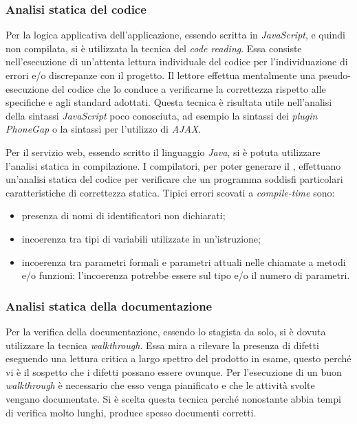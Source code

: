 \subsubsection{Analisi statica del codice}


Per la logica applicativa dell'applicazione, essendo scritta in \textit{JavaScript}, e quindi non compilata, si è utilizzata la tecnica del \textit{code reading}. Essa consiste nell'esecuzione di un'attenta lettura individuale del codice per l'individuazione di errori e/o discrepanze con il progetto. Il lettore effettua mentalmente una pseudo-esecuzione del codice che lo conduce a verificarne la correttezza rispetto alle specifiche e agli standard adottati. Questa tecnica è risultata utile nell'analisi della sintassi \textit{JavaScript} poco conosciuta, ad esempio la sintassi dei \textit{plugin PhoneGap} o la sintassi per l'utilizzo di \textit{AJAX}.


Per il servizio web, essendo scritto il linguaggio \textit{Java}, si è potuta utilizzare l'analisi statica in compilazione. I compilatori, per poter generare il , effettuano un'analisi statica del codice per verificare che un programma soddisfi particolari caratteristiche di correttezza statica. Tipici errori scovati a \textit{compile-time} sono:
\begin{itemize}
	\item presenza di nomi di identificatori non dichiarati;
	\item incoerenza tra tipi di variabili utilizzate in un'istruzione;
	\item incoerenza tra parametri formali e parametri attuali nelle chiamate a metodi e/o funzioni: l'incoerenza potrebbe essere sul tipo e/o il numero di parametri.
\end{itemize}

\subsubsection{Analisi statica della documentazione}

Per la verifica della documentazione, essendo lo stagista da solo, si è dovuta utilizzare la tecnica \textit{walkthrough}. Essa mira a rilevare la presenza di difetti eseguendo una lettura critica a largo spettro del prodotto in esame, questo perché vi è il sospetto che i difetti possano essere ovunque. Per l'esecuzione di un buon \textit{walkthrough} è necessario che esso venga pianificato e che le attività svolte vengano documentate. Si è scelta questa tecnica perché nonostante abbia tempi di verifica molto lunghi, produce spesso documenti corretti.

